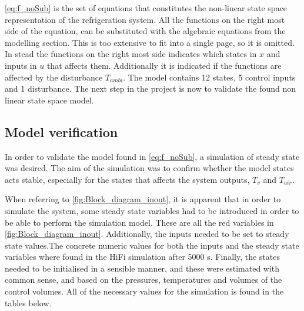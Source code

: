 \cref{eq:f_noSub} is the set of equations that constitutes the non-linear state space representation of the refrigeration system. All the functions on the right most side of the equation, can be substituted with the algebraic equations from the modelling section. This is too extensive to fit into a single page, so it is omitted. In stead the functions on the right most side indicates which states in $ x $ and inputs in $ u $ that affects them. Additionally it is indicated if the functions are affected by the disturbance $ T_{ambi} $. The model contains 12 states, 5 control inputs and 1 disturbance. The next step in the project is now to validate the found non linear state space model.

\newpage
\subsection{Model verification}\label{sec:model-verification}
In order to validate the model found in \cref{eq:f_noSub}, a simulation of steady state was desired. The aim of the simulation was to confirm whether the model states acts stable, especially for the states that affects the system outputs, $T_v$ and $T_{air}$.

When referring to \cref{fig:Block_diagram_inout}, it is apparent that in order to simulate the system, some steady state variables had to be introduced in order to be able to perform the simulation model. These are all the red variables in \cref{fig:Block_diagram_inout}. Additionally, the inputs needed to be set to steady state values.The concrete numeric values for both the inputs and the steady state variables where found in the HiFi simulation after 5000 s. Finally, the states needed to be initialised in a sensible manner, and these were estimated with common sense, and based on the pressures, temperatures and volumes of the control volumes. All of the necessary values for the simulation is found in the tables below. \\

